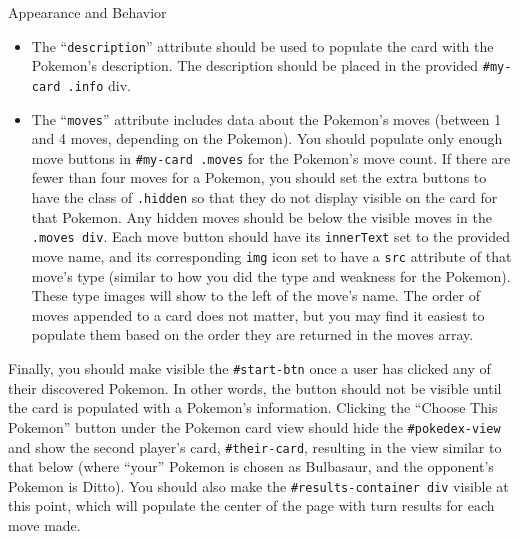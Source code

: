 \documentclass[programming]{../../../../mfcs}
\begin{document}
\begin{question}{Appearance and Behavior}
  \begin{itemize}
    \item The ``\texttt{description}'' attribute should be used to populate the card with the Pokemon's
      description. The description should be placed in the provided \texttt{\#my-card .info} div.
    \item The ``\texttt{moves}'' attribute includes data about the Pokemon's moves (between 1 and 4 moves,
      depending on the Pokemon). You should populate only enough move buttons in
      \texttt{\#my-card .moves} for the Pokemon's move count. If there are fewer than four moves
      for a Pokemon, you should set the extra buttons to have the class of \texttt{.hidden} so that
      they do not display visible on the card for that Pokemon. Any hidden moves should
      be below the visible moves in the \texttt{.moves div}.  Each move button should have its \texttt{innerText} set to the provided move name, and its
      corresponding \texttt{img} icon set to have a \texttt{src} attribute of that move's type
      (similar to how you did the type and weakness for the Pokemon). These type images will show to
      the left of the move's name. The order of moves appended to a card does not matter, but you
      may find it easiest to populate them based on the order they are returned in the moves array.
  \end{itemize}

  Finally, you should make visible the \texttt{\#start-btn} once a user has clicked any of their
  discovered Pokemon. In other words, the button should not be visible until the card is populated
  with a Pokemon's information.
\newpage
{}
  Clicking the ``Choose This Pokemon'' button under the Pokemon card view should hide the \texttt{\#pokedex-view} and show the
  second player's card, \texttt{\#their-card}, resulting in the view similar to that below (where
  ``your'' Pokemon is chosen as Bulbasaur, and the opponent's Pokemon is Ditto). You should also
  make the \texttt{\#results-container div} visible at this point, which will populate the center of the page with turn
  results for each move made.
  \newline


\end{question}
\end{document}
